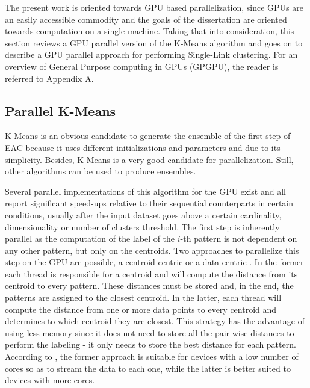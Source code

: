 The present work is oriented towards GPU based parallelization, since GPUs are an easily accessible commodity and the goals of the dissertation are oriented towards computation on a single machine.
Taking that into consideration, this section reviews a GPU parallel version of the K-Means algorithm and goes on to describe a GPU parallel approach for performing Single-Link clustering.
For an overview of General Purpose computing in GPUs (GPGPU), the reader is referred to Appendix A.


\subsection{Parallel K-Means}
\label{sec:art parallel kmeans}

K-Means is an obvious candidate to generate the ensemble of the first step of EAC because it uses different initializations and parameters and due to its simplicity.
Besides, K-Means is a very good candidate for parallelization.
Still, other algorithms can be used to produce ensembles.


Several parallel implementations of this algorithm for the GPU exist \cite{Bai2009, Wu2011, Zechner2009, Sirotkovi2012, Farivar2008} and all report significant speed-ups relative to their sequential counterparts in certain conditions, usually after the input dataset goes above a certain cardinality, dimensionality or number of clusters threshold.
The first step is inherently parallel as the computation of the label of the $i$-th pattern is not dependent on any other pattern, but only on the centroids.
Two approaches to parallelize this step on the GPU are possible, a centroid-centric or a data-centric \cite{Bai2009}.
In the former each thread is responsible for a centroid and will compute the distance from its centroid to every pattern.
These distances must be stored and, in the end, the patterns are assigned to the closest centroid.
In the latter, each thread will compute the distance from one or more data points to every centroid and determines to which centroid they are closest.
This strategy has the advantage of using less memory since it does not need to store all the pair-wise distances to perform the labeling - it only needs to store the best distance for each pattern.
According to \cite{Bai2009}, the former approach is suitable for devices with a low number of cores so as to stream the data to each one, while the latter is better suited to devices with more cores.

